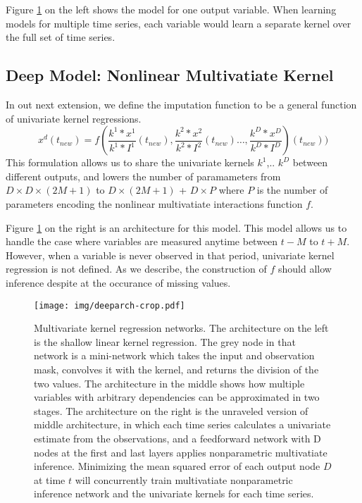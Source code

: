 \documentclass{article} %
\begin{document}
Figure \ref{fig:deepkr} on the left shows the model for one output variable. When learning models for multiple time series, each variable would learn a separate kernel over the full set of time series.

\subsection{Deep Model: Nonlinear Multivatiate Kernel}

In out next extension, we define the imputation function to be a general function of univariate kernel regressions.
$$ x^d(t_{new})=f(\frac{k^1 \ast x^1}{k^1 \ast I^1}(t_{new}), \frac{k^2 \ast x^2}{k^2 \ast I^2}(t_{new})\dots ,\frac{k^D \ast x^D}{k^D \ast I^D})(t_{new}))$$
% 
This formulation allows us to share the univariate kernels $k^1$,.. $k^D$ between different outputs, and lowers the number of paramameters from $D \times D \times (2M+1)$ to $D \times (2M+1)$ + $D \times P$ where $P$ is the number of parameters encoding the nonlinear multivatiate interactions function $f$. 

Figure \ref{fig:deepkr} on the right is an architecture for this model. This model allows us to handle the case where variables are measured anytime between $t-M$ to $t+M$. However, when 
a variable is never observed in that period, univariate kernel regression is not defined. As we describe, the construction of $f$ should allow inference despite at the occurance of missing values. 

\begin{figure}[h]
\begin{center}
\texttt{[image: img/deeparch-crop.pdf]}
\end{center}
\caption{Multivariate kernel regression networks. The architecture on the left is the shallow linear kernel regression. The grey node in that network is a mini-network which takes the input and observation mask, convolves it with the kernel, and returns the division of the two values. The architecture in the middle shows how multiple variables with arbitrary dependencies can be approximated in two stages. The architecture on the right is the unraveled version of middle architecture, in which each time series calculates a univariate estimate from the observations, and a feedforward network with D nodes at the first and last layers applies nonparametric multivatiate inference. Minimizing the mean squared error of each output node $D$ at time $t$ will concurrently train multivatiate nonparametric inference network and the univariate kernels for each time series.}\label{fig:deepkr}
\end{figure}
\end{document}
